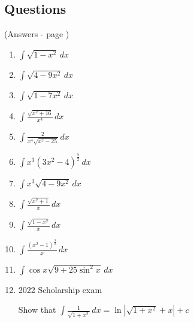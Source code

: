 \documentclass[../main.tex]{subfiles}
\begin{document}
    
\pagebreak

\subsection*{Questions}
(Answers - page \pageref*{Trig subs answers})
\label{Trig substitution}
\begin{enumerate}
    \item 
    \(\int \sqrt{1-x^2}\,dx\)

    \item 
    \(\int \sqrt{4-9x^2}\,dx\)

    \item 
    \(\int \sqrt{1-7x^2}\,dx\)

    \item 
    \(\int \frac{\sqrt{x^2+16}}{x^4}\,dx\)

    \item 
    \(\int \frac{2}{x^4\sqrt{x^2-25}}\,dx\)

    \item 
    \(\int x^3(3x^2-4)^{\frac{5}{2}}\,dx\)

    \item 
    \(\int x^3\sqrt{4-9x^2}\,dx\)

    \item 
    \(\int \frac{\sqrt{x^2+1}}{x}\,dx\)

    \item 
    \(\int \frac{\sqrt{1-x^2}}{x}\,dx\)

    \item 
    \(\int \frac{(x^2-1)^{\frac{3}{2}}}{x}\,dx\)

    \item 
    \(\int \cos{x}\sqrt{9+25\sin^2{x}}\,dx\)

    \item 2022 Scholarship exam
    
    Show that \(\int \frac{1}{\sqrt{1+x^2}}\,dx=\ln{|\sqrt{1+x^2}+x|}+c\)
    
\end{enumerate}


\pagebreak
\end{document}
